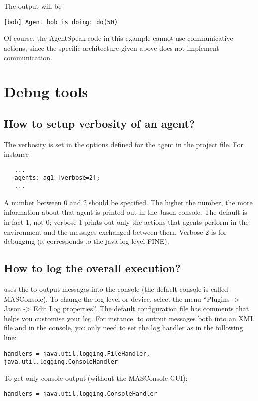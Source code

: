 \documentclass{article}
\newcommand{\jason}[0]{\htlink{\textit{Jason}}{http://jason.sf.net}\xspace}
\begin{document}
The output will be 
\begin{verbatim}
[bob] Agent bob is doing: do(50)
\end{verbatim}

Of course, the AgentSpeak code in this example cannot use communicative
actions, since the specific architecture given above does not implement
communication.

\section{Debug tools}

\subsection{How to setup verbosity of an agent?}

The verbosity is set in the options defined for the agent in the project file. For instance

\begin{verbatim}
   ... 
   agents: ag1 [verbose=2];
   ...
\end{verbatim}

A number between 0 and 2 should be specified. The higher the number,
the more information about that agent is printed out in the Jason
console. The default is in fact 1, not 0; verbose 1 prints out only
the actions that agents perform in the environment and the messages
exchanged between them. Verbose 2 is for debugging (it corresponds to
the java log level FINE).

\subsection{How to log the overall execution?}

\jason uses the 
to output messages into the console (the default console is called
MASConsole). To change the log level or device, select the menu
``Plugins -> Jason -> Edit Log properties''. The default configuration
file has comments that helps you customise your log. For instance,
to output messages both into an XML file and in the console, you only
need to set the log handler as in the following line:
\begin{verbatim}
handlers = java.util.logging.FileHandler, java.util.logging.ConsoleHandler
\end{verbatim}
To get only console output (without the MASConsole GUI):
\begin{verbatim}
handlers = java.util.logging.ConsoleHandler
\end{verbatim}
\end{document}
